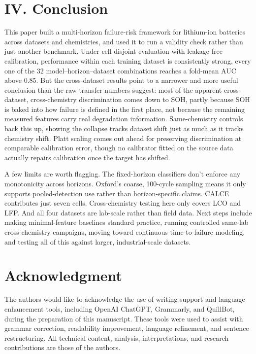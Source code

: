 \documentclass[conference]{IEEEtran}
\begin{document}
\section{IV. Conclusion}
This paper built a multi-horizon failure-risk framework for
lithium-ion batteries across datasets and chemistries, and used it to
run a validity check rather than just another benchmark. Under
cell-disjoint evaluation with leakage-free calibration, performance
within each training dataset is consistently strong, every one of the
32 model--horizon--dataset combinations reaches a fold-mean AUC above
0.85. But the cross-dataset results point to a narrower and more
useful conclusion than the raw transfer numbers suggest: most of the
apparent cross-dataset, cross-chemistry discrimination comes down to
SOH, partly because SOH is baked into how failure is defined in the
first place, not because the remaining measured features carry real
degradation information. Same-chemistry controls back this up, showing
the collapse tracks dataset shift just as much as it tracks chemistry
shift. Platt scaling comes out ahead for preserving discrimination at
comparable calibration error, though no calibrator fitted on the
source data actually repairs calibration once the target has shifted.

A few limits are worth flagging. The fixed-horizon classifiers don't
enforce any monotonicity across horizons. Oxford's coarse, 100-cycle
sampling means it only supports pooled-detection use rather than
horizon-specific claims. CALCE contributes just seven cells.
Cross-chemistry testing here only covers LCO and LFP. And all four
datasets are lab-scale rather than field data. Next steps include
making minimal-feature baselines standard practice, running controlled
same-lab cross-chemistry campaigns, moving toward continuous
time-to-failure modeling, and testing all of this against larger,
industrial-scale datasets.

\section*{Acknowledgment}
The authors would like to acknowledge the use of writing-support and
language-enhancement tools, including OpenAI ChatGPT, Grammarly, and
QuillBot, during the preparation of this manuscript. These tools were
used to assist with grammar correction, readability improvement,
language refinement, and sentence restructuring. All technical
content, analysis, interpretations, and research contributions are
those of the authors.
\end{document}
